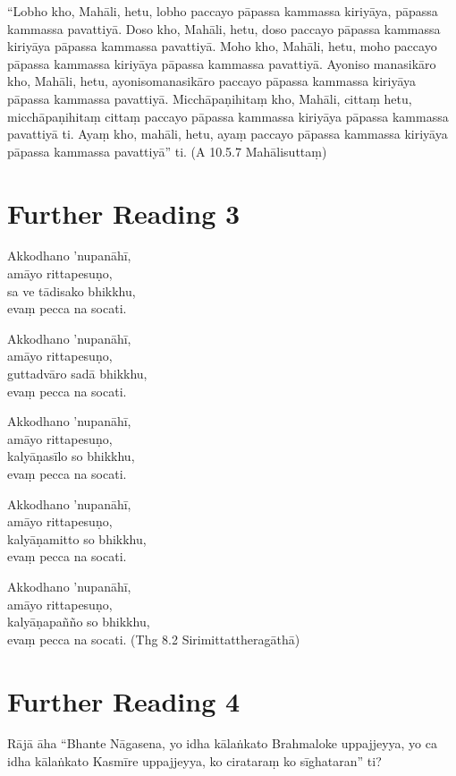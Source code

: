 “Lobho kho, Mahāli, hetu, lobho paccayo pāpassa kammassa kiriyāya, pāpassa kammassa pavattiyā. Doso kho, Mahāli, hetu, doso paccayo pāpassa kammassa kiriyāya pāpassa kammassa pavattiyā. Moho kho, Mahāli, hetu, moho paccayo pāpassa kammassa kiriyāya pāpassa kammassa pavattiyā. Ayoniso manasikāro kho, Mahāli, hetu, ayonisomanasikāro paccayo pāpassa kammassa kiriyāya pāpassa kammassa pavattiyā. Micchāpaṇihitaṃ kho, Mahāli, cittaṃ hetu, micchāpaṇihitaṃ cittaṃ paccayo pāpassa kammassa kiriyāya pāpassa kammassa pavattiyā ti. Ayaṃ kho, mahāli, hetu, ayaṃ paccayo pāpassa kammassa kiriyāya pāpassa kammassa pavattiyā” ti. (A 10.5.7 Mahālisuttaṃ)

\section*{Further Reading 3}

Akkodhano ’nupanāhī,\\
amāyo rittapesuṇo,\\
sa ve tādisako bhikkhu,\\
evaṃ pecca na socati.

Akkodhano ’nupanāhī,\\
amāyo rittapesuṇo,\\
guttadvāro sadā bhikkhu,\\
evaṃ pecca na socati.

Akkodhano ’nupanāhī,\\
amāyo rittapesuṇo,\\
kalyāṇasīlo so bhikkhu,\\
evaṃ pecca na socati.

Akkodhano ’nupanāhī,\\
amāyo rittapesuṇo,\\
kalyāṇamitto so bhikkhu,\\
evaṃ pecca na socati.

Akkodhano ’nupanāhī,\\
amāyo rittapesuṇo,\\
kalyāṇapañño so bhikkhu,\\
evaṃ pecca na socati. (Thg 8.2 Sirimittattheragāthā)

\section*{Further Reading 4}

Rājā āha “Bhante Nāgasena, yo idha kālaṅkato Brahmaloke uppajjeyya, yo ca idha kālaṅkato Kasmīre uppajjeyya, ko cirataraṃ ko sīghataran” ti?

